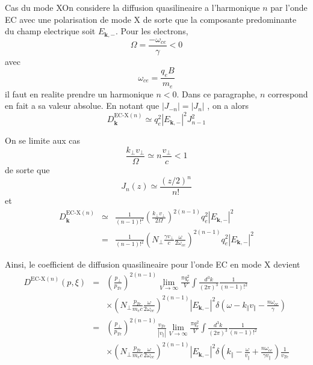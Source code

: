 Cas du mode XOn considere la diffusion quasilineaire a l'harmonique
$n$ par l'onde EC avec une polarisation de mode X de sorte que la
composante predominante du champ electrique soit $E_{\mathbf{k},-}$.
Pour les electrons, \[
\Omega=\frac{-\omega_{ce}}{\gamma}<0\]
 avec \[
\omega_{ce}=\frac{q_{e}B}{m_{e}}\]
 il faut en realite prendre un harmonique $n<0$. Dans ce paragraphe,
$n$ correspond en fait a sa valeur absolue. En notant que $\left|J_{-n}\right|=\left|J_{n}\right|$
, on a alors \[
D_{\mathbf{k}}^{\text{EC-X}(n)}\simeq q_{e}^{2}\left|E_{\mathbf{k},-}\right|^{2}J_{n-1}^{2}\]


On se limite aux cas \[
\frac{k_{\bot}v_{\bot}}{\Omega}\simeq n\frac{v_{\bot}}{c}<1\]
 de sorte que \[
J_{n}(z)\simeq\frac{(z/2)^{n}}{n!}\]
 et \begin{eqnarray*}
D_{\mathbf{k}}^{\text{EC-X}(n)} & \simeq & \frac{1}{(n-1)!^{2}}\left(\frac{k_{\bot}v_{\bot}}{2\Omega}\right)^{2(n-1)}q_{e}^{2}\left|E_{\mathbf{k},-}\right|^{2}\\
 & = & \frac{1}{(n-1)!^{2}}\left(N_{\bot}\frac{\gamma v_{\bot}}{c}\frac{\omega}{2\omega_{ce}}\right)^{2(n-1)}q_{e}^{2}\left|E_{\mathbf{k},-}\right|^{2}\end{eqnarray*}


Ainsi, le coefficient de diffusion quasilineaire pour l'onde EC en
mode X devient \begin{eqnarray*}
D^{\text{EC-X}(n)}(p,\xi) & = & \left(\frac{p_{\bot}}{p_{Te}}\right)^{2(n-1)}\lim_{V\rightarrow\infty}\frac{\pi q_{e}^{2}}{V}\int\frac{d^{3}k}{(2\pi)^{3}}\frac{1}{(n-1)!^{2}}\\
 &  & \times\left(N_{\bot}\frac{p_{Te}}{m_{e}c}\frac{\omega}{2\omega_{ce}}\right)^{2(n-1)}\left|E_{\mathbf{k},-}\right|^{2}\delta\left(\omega-k_{\Vert}v_{\Vert}-\frac{n\omega_{ce}}{\gamma}\right)\\
 & = & \left(\frac{p_{\bot}}{p_{Te}}\right)^{2(n-1)}\frac{v_{Te}}{\left|v_{\Vert}\right|}\lim_{V\rightarrow\infty}\frac{\pi q_{e}^{2}}{V}\int\frac{d^{3}k}{(2\pi)^{3}}\frac{1}{(n-1)!^{2}}\\
 &  & \times\left(N_{\bot}\frac{p_{Te}}{m_{e}c}\frac{\omega}{2\omega_{ce}}\right)^{2(n-1)}\left|E_{\mathbf{k},-}\right|^{2}\delta\left(k_{\Vert}-\frac{\omega}{v_{\Vert}}+\frac{n\omega_{ce}}{\gamma v_{\Vert}}\right)\frac{1}{v_{Te}}\end{eqnarray*}


